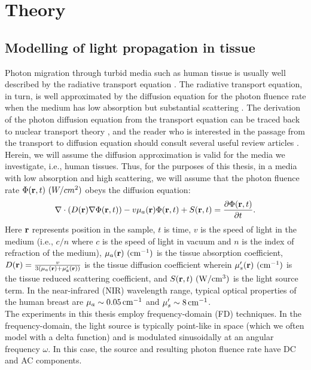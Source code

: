\chapter{Theory}
\section{Modelling of light propagation in tissue}
Photon migration through turbid media such as human tissue is usually well described by the radiative transport equation \cite{Durduran2010,Ishimaru1978}. The radiative transport equation, in turn, is well approximated by the diffusion equation for the photon fluence rate when the medium has low absorption but substantial scattering \cite{Ishimaru1978,Rossum1999}. The derivation of the photon diffusion equation from the transport equation can be traced back to nuclear transport theory \cite{Case1967}, and the reader who is interested in the passage from the transport to diffusion equation should consult several useful review articles \cite{Durduran2010,Gibson2005,Venugopal2012}. Herein, we will assume the diffusion approximation is valid for the media we investigate, i.e., human tissues. Thus, for the purposes of this thesis, in a media with low absorption and high scattering, we will assume that the photon fluence rate $\Phi(\mbf{r},t) \ (W/cm^{2})$ obeys the diffusion equation:
%
\begin{equation}
\label{eqn:DEtime}
\nabla\cdot ( D(\mathbf{r}) \nabla \Phi(\mathbf{r},t)) - v\mu_a(\mathbf{r}) \Phi(\mathbf{r},t) + S(\mathbf{r},t) = \frac{\partial \Phi(\mathbf{r},t)}{\partial t}.
\end{equation}
\noindent
Here $\mathbf{r}$ represents position in the sample, $t$ is time, $v$ is the speed of light in the medium (i.e., $c/n$ where $c$ is the speed of light in vacuum and $n$ is the index of refraction of the medium), $\mu_a(\mathbf{r})\ (\rm{cm^{-1}})$ is the tissue absorption coefficient, $D(\mathbf{r})=\frac{v}{3(\mu_a(\bf{r})+\mu_s^{\prime}(\mathbf{r}))}$ is the tissue diffusion coefficient wherein $\mu_s'(\mathbf{r})~(\rm{cm^{-1}})$ is the tissue reduced scattering coefficient, and $S(\mathbf{r},t)\ (\rm{W/cm^{3}})$ is the light source term. In the near-infrared (NIR) wavelength range, typical optical properties of the human breast are $\mu_a\sim 0.05\,\rm{ cm^{-1}}$ and $\mu_s^{\prime}\sim 8\,\rm{ cm^{-1}}$.
\\ \indent
The experiments in this thesis employ frequency-domain (FD) techniques. In the frequency-domain, the light source is typically point-like in space (which we often model with a delta function) and is modulated sinusoidally at an angular frequency $\omega$. In this case, the source and resulting photon fluence rate have DC and AC components. %
